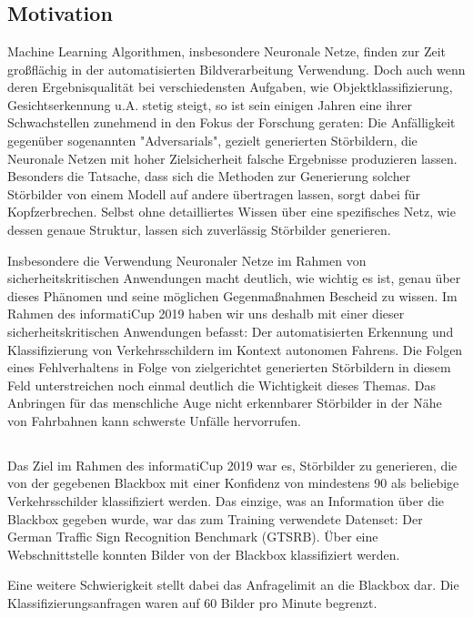 \chapter{}
\label{cha:introduction}

\section{Motivation}

Machine Learning Algorithmen, insbesondere Neuronale Netze, finden zur Zeit großflächig in der automatisierten Bildverarbeitung Verwendung. 
Doch auch wenn deren Ergebnisqualität bei verschiedensten Aufgaben, wie Objektklassifizierung, Gesichtserkennung u.A. stetig steigt, so ist sein einigen Jahren
eine ihrer Schwachstellen zunehmend in den Fokus der Forschung geraten:
Die Anfälligkeit gegenüber sogenannten "Adversarials", gezielt generierten Störbildern, die Neuronale Netzen mit hoher Zielsicherheit falsche Ergebnisse produzieren lassen. Besonders die Tatsache, dass sich die Methoden zur Generierung solcher Störbilder von einem Modell auf andere übertragen lassen, sorgt dabei für Kopfzerbrechen. Selbst ohne detailliertes Wissen über eine spezifisches Netz, wie dessen genaue Struktur, lassen sich zuverlässig Störbilder generieren.

Insbesondere die Verwendung Neuronaler Netze im Rahmen von sicherheitskritischen Anwendungen macht deutlich, wie wichtig es ist, genau über dieses Phänomen und seine möglichen Gegenmaßnahmen Bescheid zu wissen. Im Rahmen des informatiCup 2019 haben wir uns deshalb mit einer dieser sicherheitskritischen Anwendungen befasst: Der automatisierten Erkennung und Klassifizierung von Verkehrsschildern im Kontext autonomen Fahrens. 
Die Folgen eines Fehlverhaltens in Folge von zielgerichtet generierten Störbildern in diesem Feld unterstreichen noch einmal deutlich die Wichtigkeit dieses Themas. Das Anbringen für das menschliche Auge nicht erkennbarer Störbilder in der Nähe von Fahrbahnen kann schwerste Unfälle hervorrufen.   


\section{}

Das Ziel im Rahmen des informatiCup 2019 war es, Störbilder zu generieren, die von der gegebenen Blackbox mit einer Konfidenz von mindestens 90%
als beliebige Verkehrsschilder klassifiziert werden. 
Das einzige, was an Information über die Blackbox gegeben wurde, war das zum Training verwendete Datenset: Der German Traffic Sign Recognition Benchmark (GTSRB).
Über eine Webschnittstelle konnten Bilder von der Blackbox klassifiziert werden. 

Eine weitere Schwierigkeit stellt dabei das Anfragelimit an die Blackbox dar. Die Klassifizierungsanfragen waren auf 60 Bilder pro Minute begrenzt. 

